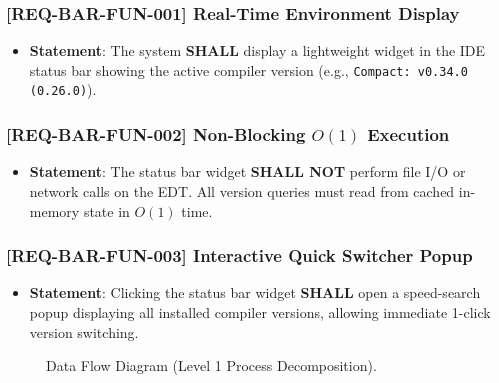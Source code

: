 \subsubsection{[REQ-BAR-FUN-001] Real-Time Environment Display}
\begin{itemize}
    \item \textbf{Statement}: The system \textbf{SHALL} display a lightweight widget in the IDE status bar showing the active compiler version (e.g., \texttt{Compact: v0.34.0 (0.26.0)}).
\end{itemize}

\subsubsection{[REQ-BAR-FUN-002] Non-Blocking \texorpdfstring{$O(1)$}{O(1)} Execution}
\begin{itemize}
    \item \textbf{Statement}: The status bar widget \textbf{SHALL NOT} perform file I/O or network calls on the EDT. All version queries must read from cached in-memory state in $O(1)$ time.
\end{itemize}

\subsubsection{[REQ-BAR-FUN-003] Interactive Quick Switcher Popup}
\begin{itemize}
    \item \textbf{Statement}: Clicking the status bar widget \textbf{SHALL} open a speed-search popup displaying all installed compiler versions, allowing immediate 1-click version switching.
\end{itemize}

\begin{figure}[htbp]
    \centering
    
    \caption{Data Flow Diagram (Level 1 Process Decomposition).}
    \label{fig:data_flow_diagram}
\end{figure}

